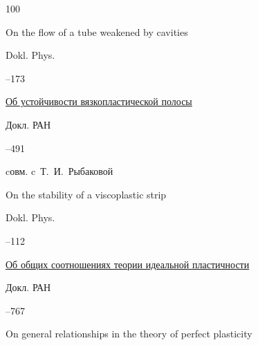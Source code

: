 \begin{thebibliography}{100}

\transl



\paper On the flow of a tube weakened by cavities

\jour Dokl. Phys.




--173






\paper \href{http://mi.mathnet.ru/dan20335}{Об устойчивости вязкопластической полосы}

\jour Докл. РАН




--491


\miscnote cовм. c~Т.~И.~Рыбаковой

\transl

\paper On the stability of a viscoplastic strip

\jour Dokl. Phys.




--112







\paper \href{http://mi.mathnet.ru/dan19771}{Об общих соотношениях теории идеальной пластичности}

\jour Докл. РАН




--767


\transl

\paper On general relationships in the theory of perfect plasticity


\end{thebibliography}
